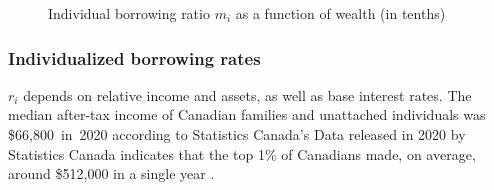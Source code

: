 \begin{figure}[htb]
\caption{Individual borrowing ratio $m_i$ as a function of wealth (in tenths)}
 \label{Fig:Borrowingratio}
\end{figure}


\subsubsection{Individualized borrowing rates}\label{SS:BorowingRate}
 
 
 $r_i$ depends on relative income and assets, as well as base interest rates. %
 The median after-tax income of Canadian families and unattached individuals was \$66,800 in 2020 according to Statistics Canada's %
 Data released in 2020 by Statistics Canada indicates that the top 1\% of Canadians made, on average, around \$512,000 in a single year \cite{stats-can-canadian-incomes}. %

